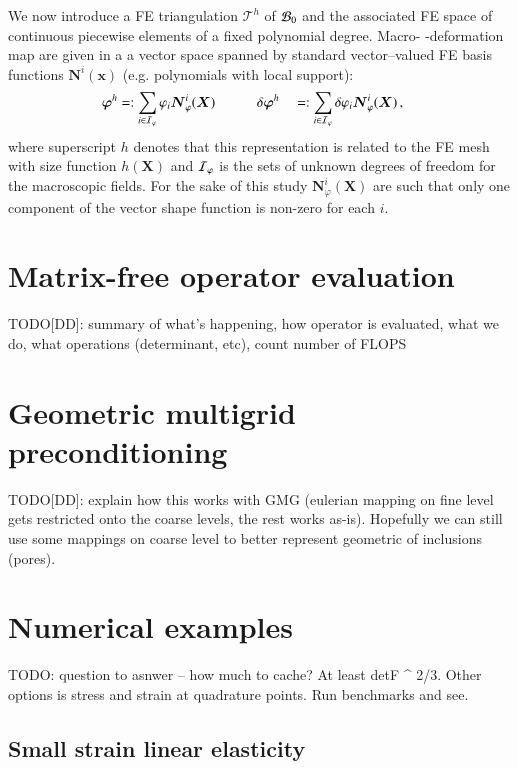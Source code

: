 \documentclass[preprint,12pt,times]{elsarticle}
\def\gz  #1{           \mbox{$\boldsymbol{#1}$}}
\def\mcl  #1{               {\cal #1}}
\begin{document}
We now introduce a FE triangulation $\mathcal{T}^h$ of $\mcl B_0$ and
the associated FE space of continuous piecewise elements of a fixed polynomial degree. %
Macro- -deformation map are given in a
a vector space spanned by standard vector--valued FE basis functions $\gz N^i(\gz x)$ (e.g. polynomials with local support):
\begin{alignat}{2}
       \gz \varphi^h &=:  \sum_{i \in \mcl I_\varphi}       \varphi_i \gz N^i_\varphi (\gz X) \quad \quad \quad
\delta \gz \varphi^h &&=: \sum_{i \in \mcl I_\varphi} \delta \varphi_i \gz N^i_\varphi (\gz X) \,,
\end{alignat}
where superscript $h$ denotes that this representation is related to the FE mesh with size function $h(\gz X)$ and $\mcl I_\varphi$ is the sets of unknown degrees of freedom for the
macroscopic fields. For the sake of this study $\gz N^i_\varphi (\gz X)$ are such that only one component of the vector shape function is non-zero for each $i$.

\section{Matrix-free operator evaluation}

TODO[DD]: summary of what's happening, how operator is evaluated, what we do, what operations (determinant, etc), count number of FLOPS

\section{Geometric multigrid preconditioning}

TODO[DD]: explain how this works with GMG (eulerian mapping on fine level gets restricted onto the coarse levels, the rest works as-is).
Hopefully we can still use some mappings on coarse level to better represent geometric of inclusions (pores).

\section{Numerical examples}

TODO: question to asnwer -- how much to cache? At least detF ^ {2/3}. Other options is stress and strain at quadrature points.
Run benchmarks and see.

\subsection{Small strain linear elasticity}
\end{document}
